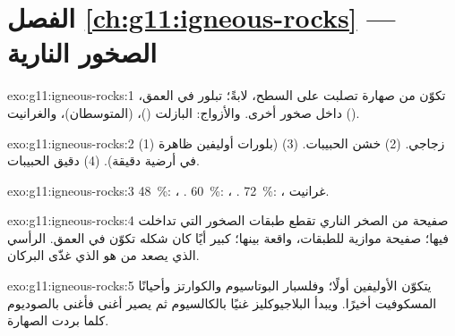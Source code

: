 \section*{الفصل \ref{ch:g11:igneous-rocks} --- الصخور النارية}

\begin{solution}{exo:g11:igneous-rocks:1}
 تكوّن من صهارة تصلبت على السطح، لابةً؛  تبلور في العمق، داخل صخور أخرى. والأزواج: البازلت
 ()،   (المتوسطان)،  والغرانيت
().
\end{solution}

\begin{solution}{exo:g11:igneous-rocks:2}
(1) زجاجي. (2) خشن الحبيبات. (3)  (بلورات أوليفين ظاهرة في
أرضية دقيقة). (4) دقيق الحبيبات.
\end{solution}

\begin{solution}{exo:g11:igneous-rocks:3}
\qty{48}{\percent}: ، . \qty{60}{\percent}: ، .
\qty{72}{\percent}: ، غرانيت.
\end{solution}

\begin{solution}{exo:g11:igneous-rocks:4}
 صفيحة من الصخر الناري تقطع طبقات الصخور التي
تداخلت فيها؛  صفيحة موازية للطبقات، واقعة بينها؛ 
 كبير أيًا كان شكله تكوّن في العمق.  الرأسي الذي يصعد
من  هو الذي غذّى البركان.
\end{solution}

\begin{solution}{exo:g11:igneous-rocks:5}
يتكوّن الأوليفين أولًا؛ وفلسبار البوتاسيوم والكوارتز وأحيانًا المسكوفيت
أخيرًا. ويبدأ البلاجيوكليز غنيًا بالكالسيوم ثم يصير أغنى فأغنى
بالصوديوم كلما بردت الصهارة.
\end{solution}

